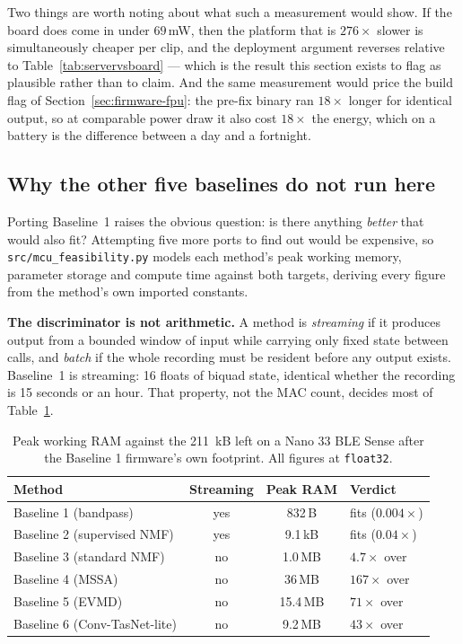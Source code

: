\documentclass[11pt]{article}
\begin{document}
Two things are worth noting about what such a measurement would show. If the
board does come in under $69$\,mW, then the platform that is $276\times$
slower is simultaneously cheaper per clip, and the deployment argument
reverses relative to Table~\ref{tab:servervsboard} --- which is the result
this section exists to flag as plausible rather than to claim. And the same
measurement would price the build flag of Section~\ref{sec:firmware-fpu}: the
pre-fix binary ran $18\times$ longer for identical output, so at comparable
power draw it also cost $18\times$ the energy, which on a battery is the
difference between a day and a fortnight.

\subsection{Why the other five baselines do not run here}
\label{sec:firmware-others}

Porting Baseline~1 raises the obvious question: is there anything
\emph{better} that would also fit? Attempting five more ports to find out
would be expensive, so \texttt{src/mcu\_feasibility.py} models each method's
peak working memory, parameter storage and compute time against both targets,
deriving every figure from the method's own imported constants.

\textbf{The discriminator is not arithmetic.} A method is \emph{streaming} if
it produces output from a bounded window of input while carrying only fixed
state between calls, and \emph{batch} if the whole recording must be resident
before any output exists. Baseline~1 is streaming: 16 floats of biquad state,
identical whether the recording is 15 seconds or an hour. That property, not
the MAC count, decides most of Table~\ref{tab:mcufeas}.

\begin{table}[H]
\centering
\caption{Peak working RAM against the 211~kB left on a Nano 33 BLE Sense after the Baseline 1 firmware's own footprint. All figures at \texttt{float32}.}
\label{tab:mcufeas}
\begin{tabular}{@{}lccl@{}}
\toprule
Method & Streaming & Peak RAM & Verdict \\
\midrule
Baseline 1 (bandpass)        & yes & 832\,B  & fits ($0.004\times$) \\
Baseline 2 (supervised NMF)  & yes & 9.1\,kB & fits ($0.04\times$) \\
Baseline 3 (standard NMF)    & no  & 1.0\,MB & $4.7\times$ over \\
Baseline 4 (MSSA)            & no  & 36\,MB  & $167\times$ over \\
Baseline 5 (EVMD)            & no  & 15.4\,MB & $71\times$ over \\
Baseline 6 (Conv-TasNet-lite) & no & 9.2\,MB & $43\times$ over \\
\bottomrule
\end{tabular}
\end{table}
\end{document}
